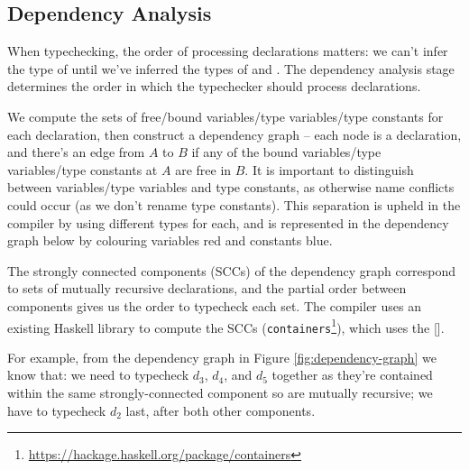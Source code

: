 \documentclass[dissertation.tex]{subfiles}
\begin{document}
{{    }
    \subsection{Dependency Analysis}\label{sec:dependency-analysis}
    {

        When typechecking, the order of processing declarations matters: we can't infer the type of  until we've inferred the types of  and . The dependency analysis stage determines
        the order in which the typechecker should process declarations.

        We compute the sets of free/bound variables/type variables/type constants for each declaration, then construct a
        dependency graph -- each node is a declaration, and there's an edge from \(A\) to \(B\) if any of the bound
        variables/type variables/type constants at \(A\) are free in \(B\). It is important to distinguish between
        variables/type variables and type constants, as otherwise name conflicts could occur (as we don't rename type
        constants). This separation is upheld in the compiler by using different types for each, and is represented in
        the dependency graph below by colouring variables red and constants blue.

        The strongly connected components (SCCs) of the dependency graph correspond to sets of mutually recursive
        declarations, and the partial order between components gives us the order to typecheck each set. The compiler
        uses an existing Haskell library to compute the SCCs
        (\texttt{containers}\footnote{\url{https://hackage.haskell.org/package/containers}}), which uses the [].

        
        For example, from the dependency graph in Figure \ref{fig:dependency-graph} we know that: we need to typecheck
        \(d_3\), \(d_4\), and \(d_5\) together as they're contained within the same strongly-connected component so are
        mutually recursive; we have to typecheck \(d_2\) last, after both other components.

}}
\end{document}
